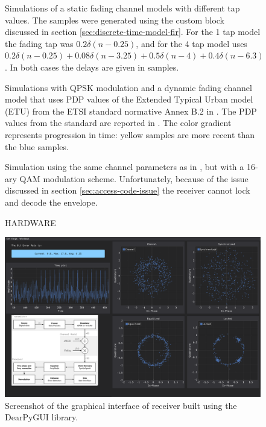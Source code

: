 \begin{figure}
	\centering
	\label{fig:qpsk-simulations-static}
	
	\caption{
		Simulations of a static fading channel models with different tap values. The samples were generated using the custom block discussed in section \ref{sec:discrete-time-model-fir}. For the 1 tap model the fading tap was \(0.2\delta(n - 0.25)\), and for the 4 tap model uses \(0.2 \delta(n - 0.25) + 0.08 \delta(n - 3.25) + 0.5 \delta(n - 4) + 0.4 \delta(n - 6.3)\). In both cases the delays are given in samples.
	}
\end{figure}
\newpage
\begin{figure}
	\centering
	
	\caption{
		Simulations with QPSK modulation and a dynamic fading channel model that uses PDP values of the Extended Typical Urban model (ETU) from the ETSI standard normative Annex B.2 in \cite{ETSI}. The PDP values from the standard are reported in . The color gradient represents progression in time: yellow samples are more recent than the blue samples.
		\label{fig:qpsk-simulations-dynamic}
	}
\end{figure}
\newpage
\begin{figure}
	\centering
	
	\caption{
		Simulation using the same channel parameters as in , but with a 16-ary QAM modulation scheme. Unfortunately, because of the issue discussed in section \ref{sec:access-code-issue} the receiver cannot lock and decode the envelope.
	}
\end{figure}
\begin{figure}
	\centering
	
	\caption{
		HARDWARE
	\label{fig:hardware-mesurement}
	}
\end{figure}
\newpage
\restoregeometry

\begin{figure}
	\centering
	\includegraphics[frame, width = \linewidth]{figures/screenshots/gui_screenshot}
	\caption{Screenshot of the graphical interface of receiver built using the DearPyGUI library.}
\end{figure}
